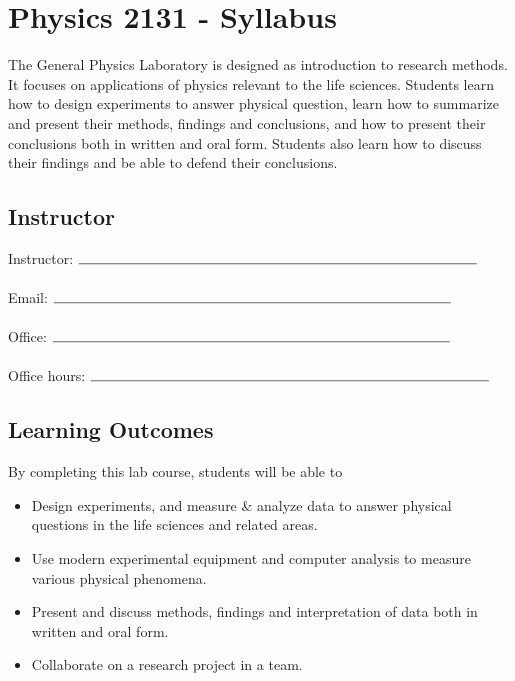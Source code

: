 \clearpage
\setcounter{page}{1}

\chapter*{Physics 2131 - Syllabus}
\thispagestyle{fancy}
The General Physics Laboratory is designed as introduction to research methods.
It focuses on applications of physics relevant to the life sciences.
Students learn how to design experiments to answer physical question, learn how to summarize and present their methods, findings and conclusions, and how to present their conclusions both in written and oral form.
Students also learn how to discuss their findings and be able to defend their conclusions.

\section*{Instructor}
Instructor: $\rule{10cm}{0.15mm}$ \\
\medskip \\ 
Email: $\rule{10cm}{0.15mm}$ \\
\medskip \\
Office: $\rule{10cm}{0.15mm}$ \\
\medskip \\
Office hours: $\rule{10cm}{0.15mm}$

\section*{Learning Outcomes}
By completing this lab course, students will be able to
\begin{itemize}
\item Design experiments, and measure \& analyze data to answer physical questions in the life sciences and related areas.
\item Use modern experimental equipment and computer analysis to measure various physical phenomena.
\item Present and discuss methods, findings and interpretation of data both in written and oral form.
\item Collaborate on a research project in a team.
\end{itemize}

\newpage


